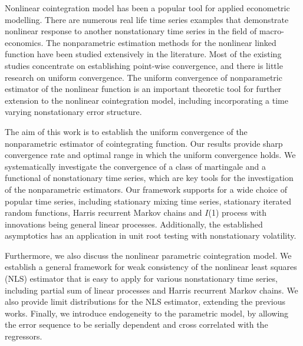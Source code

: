 


\begin{abstracts}        %
Nonlinear cointegration model has been a popular tool for applied econometric modelling. There are numerous real life time series examples that demonstrate nonlinear response to another nonstationary time series in the field of macro-economics. The nonparametric estimation methods for the nonlinear linked function have been studied extensively in the literature. Most of the existing studies concentrate on establishing point-wise convergence, and there is little research on uniform convergence. The uniform convergence of nonparametric estimator of the nonlinear function is an important theoretic tool for further extension to the nonlinear cointegration model, including incorporating a time varying nonstationary error structure.

The aim of this work is to establish the uniform convergence of the nonparametric estimator of cointegrating function. Our results provide sharp convergence rate and  optimal range in which the uniform convergence holds. We systematically investigate the convergence of a class of martingale and a functional of nonstationary time series, which are key tools for the investigation of the nonparametric estimators.  Our framework supports for a wide choice of popular time series, including stationary mixing time series, stationary iterated random functions, Harris recurrent Markov chains and $I$(1) process with innovations being general linear processes. Additionally, the established asymptotics has an application in unit root testing with nonstationary volatility.

Furthermore, we also discuss the nonlinear parametric cointegration model. We establish a general framework for weak consistency of the nonlinear least squares (NLS) estimator that is easy to apply for various nonstationary time series, including partial sum of linear processes and Harris recurrent Markov chains. We also provide limit distributions for the NLS estimator, extending the previous works. Finally, we introduce endogeneity to the parametric model, by allowing the error sequence to be serially dependent and cross correlated with the regressors.


\end{abstracts}





